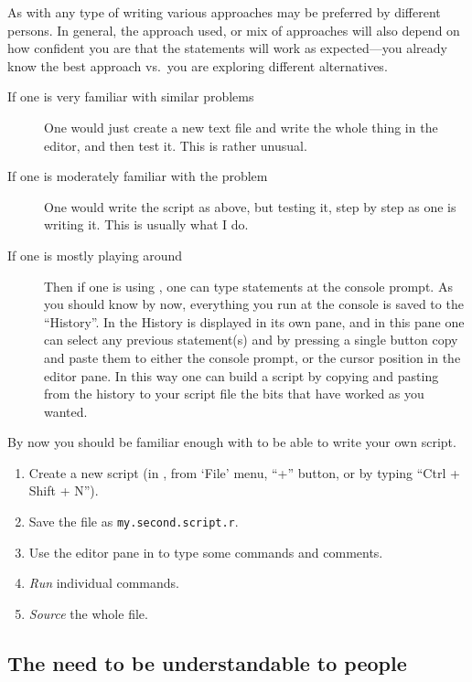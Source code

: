 \documentclass[krantz2]{krantz}\usepackage{knitr}%
\begin{document}
As with any type of writing various approaches may be preferred by different persons. In general, the approach used, or mix of approaches will also depend on how confident you are that the statements will work as expected---you already know the best approach vs.\ you are exploring different alternatives.
\begin{description}
\item[If one is very familiar with similar problems] One would just create a new text file and write the whole thing in the editor, and then test it. This is rather unusual.
\item[If one is moderately familiar with the problem] One would write the script as above, but testing it, step by step as one is writing it. This is usually what I do.
\item[If one is mostly playing around] Then if one is using \RStudio, one can type statements at the console prompt. As you should know by now, everything you run at the console is saved to the ``History''. In \RStudio the History is displayed in its own pane, and in this pane one can select any previous statement(s) and by pressing a single button copy and paste them to either the \Rlang console prompt, or the cursor position in the editor pane. In this way one can build a script by copying and pasting from the history to your script file the bits that have worked as you wanted.
\end{description}

\begin{playground}
By now you should be familiar enough with \Rlang to be able to write your own script.
\begin{enumerate}
  \item Create a new \Rpgrm script (in \RStudio, from `File' menu, ``+'' button, or by typing ``Ctrl + Shift + N'').
  \item Save the file as \texttt{my.second.script.r}.
  \item Use the editor pane in \RStudio to type some \Rpgrm commands and comments.
  \item \emph{Run} individual commands.
  \item \emph{Source} the whole file.
\end{enumerate}
\end{playground}

\subsection{The need to be understandable to people}\label{sec:script:readability}
\end{document}
